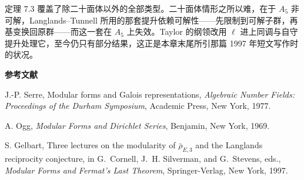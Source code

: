 \begin{annote}
定理 7.3 覆盖了除二十面体以外的全部类型。二十面体情形之所以难，在于 $A_5$ 非可解，Langlands--Tunnell 所用的那套提升依赖可解性——先限制到可解子群，再基变换回原群——而这一套在 $A_5$ 上失效。Taylor 的纲领改用 $\ell$ 进上同调与自守提升处理它，至今仍只有部分结果，这正是本章末尾所引那篇 1997 年短文写作时的状况。
\par{}
\end{annote}

{\small
\par\medskip\noindent\textbf{参考文献}\par\nopagebreak
\noindent[1] J.-P. Serre, Modular forms and Galois representations, \emph{Algebraic Number Fields: Proceedings of the Durham Symposium}, Academic Press, New York, 1977.\par
\noindent[2] A. Ogg, \emph{Modular Forms and Dirichlet Series}, Benjamin, New York, 1969.\par
\noindent[3] S. Gelbart, Three lectures on the modularity of $\bar\rho_{E,3}$ and the Langlands reciprocity conjecture, in G.~Cornell, J.~H. Silverman, and G.~Stevens, eds., \emph{Modular Forms and Fermat's Last Theorem}, Springer-Verlag, New York, 1997.\par
}

\let\thesection\chFourOldTheSection
